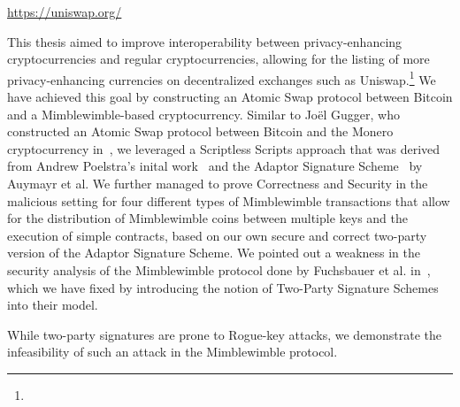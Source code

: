\urldef{\urluniswp}\url{https://uniswap.org/}

This thesis aimed to improve interoperability between privacy-enhancing cryptocurrencies and regular cryptocurrencies, allowing for the listing of more privacy-enhancing currencies on decentralized exchanges such as Uniswap.\footnote{\urluniswp}
We have achieved this goal by constructing an Atomic Swap protocol between Bitcoin and a Mimblewimble-based cryptocurrency.
Similar to Joël Gugger, who constructed an Atomic Swap protocol between Bitcoin and the Monero cryptocurrency in~\cite{gugger2020bitcoin}, we leveraged a Scriptless Scripts approach that was derived from Andrew Poelstra's inital work~\cite{poelstra2017scriptless} and the Adaptor Signature Scheme~\cite{aumayr2020bitcoinchannels} by Auymayr et al.
We further managed to prove Correctness and Security in the malicious setting for four different types of Mimblewimble transactions that allow for the distribution of Mimblewimble coins between multiple keys and the execution of simple contracts, based on our own secure and correct two-party version of the Adaptor Signature Scheme.
We pointed out a weakness in the security analysis of the Mimblewimble protocol done by Fuchsbauer et al. in~\cite{fuchsbauer2019aggregate}, which we have fixed by introducing the notion of Two-Party Signature Schemes into their model.

While two-party signatures are prone to Rogue-key attacks, we demonstrate the infeasibility of such an attack in the Mimblewimble protocol.


